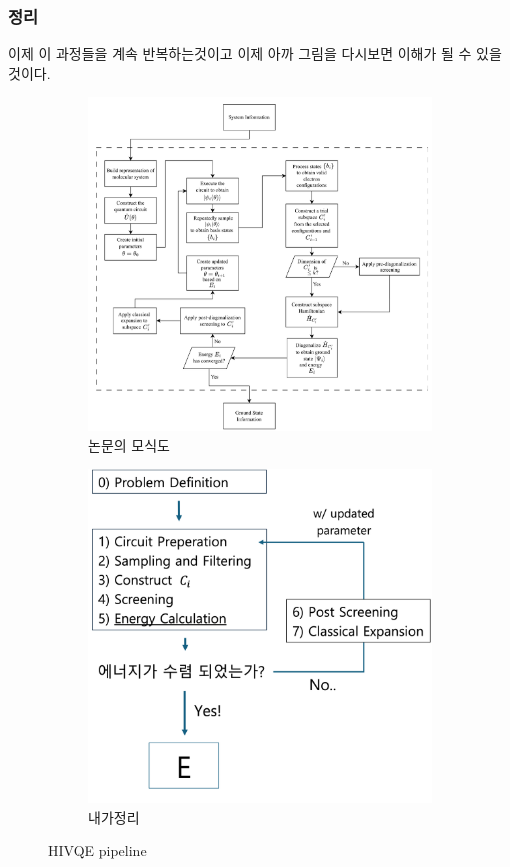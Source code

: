 \documentclass[11pt]{article}
\begin{document}
\subsubsection{정리}
이제 이 과정들을 계속 반복하는것이고 이제 아까 그림을 다시보면 이해가 될 수 있을것이다. 
\begin{figure}[H]
  \centering
  \begin{subfigure}[b]{0.45\textwidth}
    \includegraphics[width=\textwidth]{fig/HIVQE_paper.png}
    \caption{논문의 모식도}
    \label{fig:first}
  \end{subfigure}
  \hfill
  \vrule width 1pt  %
  \hfill
  \begin{subfigure}[b]{0.45\textwidth}
    \includegraphics[width=\textwidth]{fig/HIVQE_my.png}
    \caption{내가정리}
    \label{fig:second}
  \end{subfigure}
  \caption{HIVQE pipeline}
  \label{fig:two_figures_side_by_side}
\end{figure}
\end{document}
